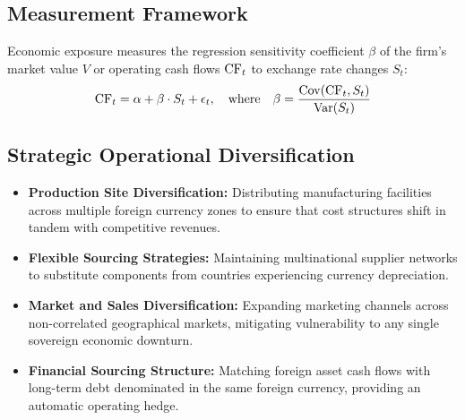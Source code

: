 \subsection{Measurement Framework}
Economic exposure measures the regression sensitivity coefficient $\beta$ of the firm's market value $V$ or operating cash flows $\operatorname{CF}_t$ to exchange rate changes $S_t$:
\begin{equation}
\operatorname{CF}_t = \alpha + \beta \cdot S_t + \epsilon_t, \quad \text{where} \quad \beta = \frac{\operatorname{Cov}(\operatorname{CF}_t, S_t)}{\operatorname{Var}(S_t)}
\end{equation}

\subsection{Strategic Operational Diversification}
\begin{itemize}[leftmargin=1.5em]
    \item \textbf{Production Site Diversification:} Distributing manufacturing facilities across multiple foreign currency zones to ensure that cost structures shift in tandem with competitive revenues.
    \item \textbf{Flexible Sourcing Strategies:} Maintaining multinational supplier networks to substitute components from countries experiencing currency depreciation.
    \item \textbf{Market and Sales Diversification:} Expanding marketing channels across non-correlated geographical markets, mitigating vulnerability to any single sovereign economic downturn.
    \item \textbf{Financial Sourcing Structure:} Matching foreign asset cash flows with long-term debt denominated in the same foreign currency, providing an automatic operating hedge.
\end{itemize}
